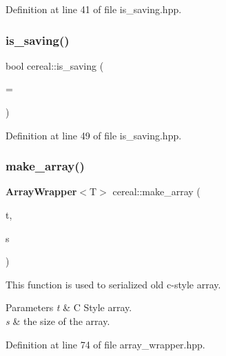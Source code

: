 Definition at line 41 of file is\+\_\+saving.\+hpp.

\mbox{\label{namespacecereal_ae36f718d7a857ad4bbfbc7c8f4c52ade}} 
\subsubsection{is\+\_\+saving()\hspace{0.1cm}{\footnotesize\ttfamily [2/2]}}
{\footnotesize\ttfamily bool cereal\+::is\+\_\+saving (\begin{DoxyParamCaption}\item[{const typename std\+::enable\+\_\+if$<$ !\textbf{ is\+\_\+cereal\+\_\+archive\+\_\+saving}$<$ Archive $>$\+::value, Archive $>$\+::type $\ast$}]{ = {} }\end{DoxyParamCaption})}



Definition at line 49 of file is\+\_\+saving.\+hpp.

\mbox{\label{namespacecereal_ae5171232885f9fd98ef0bae0fa6793f6}} 
\subsubsection{make\+\_\+array()}
{\footnotesize\ttfamily \textbf{ Array\+Wrapper}$<$T$>$ cereal\+::make\+\_\+array (\begin{DoxyParamCaption}\item[{T $\ast$\&}]{t,  }\item[{S \&}]{s }\end{DoxyParamCaption})\hspace{0.3cm}{\ttfamily [inline]}}



This function is used to serialized old c-\/style array. 


\begin{DoxyParams}{Parameters}
{\em t} & C Style array. \\
\hline
{\em s} & the size of the array. \\
\hline
\end{DoxyParams}


Definition at line 74 of file array\+\_\+wrapper.\+hpp.

\mbox{\label{namespacecereal_a302ac5752d711754c1832ce103328095}} 
